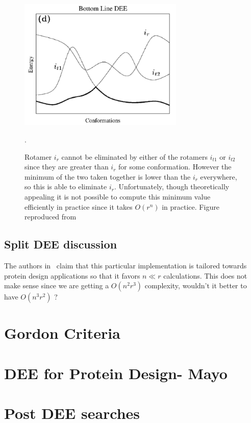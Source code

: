 \documentclass{article}
\begin{document}
\begin{figure}[h!]
    \centering
    \includegraphics[width=0.7\textwidth]{pics/bottom.pdf}
    \caption{Rotamer $i_r$ cannot be eliminated by either of the rotamers $i_{t1}$ or $i_{t2}$ since they are greater than $i_r$ for some conformation. However the minimum of the two taken together is lower than the $i_r$ everywhere, so this is able to eliminate $i_r$. Unfortunately, though theoretically appealing it is not possible to compute this minimum value efficiently in practice since it takes $O(r^n)$ in practice. Figure reproduced from~\cite{Pierce2000}}.
    \label{fig:bottomDEE}
\end{figure}

\pagebreak

\subsection*{Split DEE discussion}
The authors in~\cite{Pierce2000} claim that this particular implementation is tailored towards protein design applications so that it favors $n \ll r$ calculations. This does not make sense since we are getting a $O(n^2r^3)$ complexity, wouldn't it better to have $O(n^3r^2)$ ?

\section{Gordon Criteria}

\section{DEE for Protein Design- Mayo}

\section{Post DEE searches}
\end{document}
